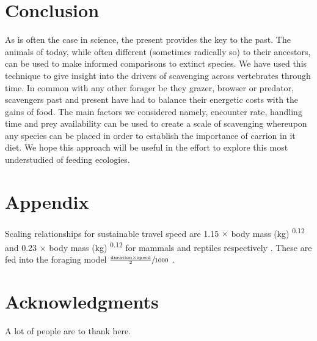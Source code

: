 \documentclass[a4paper,12pt]{article}
\begin{document}
\section*{Conclusion} 
As is often the case in science, the present provides the key to the past.
The animals of today, while often different (sometimes radically so) to their ancestors, can be used to make informed comparisons to extinct species. 
We have used this technique to give insight into the drivers of scavenging across vertebrates through time.
In common with any other forager be they grazer, browser or predator, scavengers past and present have had to balance their energetic costs with the gains of food. 
The main factors we considered namely, encounter rate, handling time and prey availability can be used to create a scale of scavenging whereupon any species can be placed in order to establish the importance of carrion in it diet.
We hope this approach will be useful in the effort to explore this most understudied of feeding ecologies. 


\section*{Appendix}
Scaling relationships for sustainable travel speed are 1.15 $\times$ body mass (kg) \textsuperscript{0.12} and 0.23 $\times$ body mass (kg) \textsuperscript{0.12} for mammals and reptiles respectively \citep{ruxton2004obligate}.
These are fed into the foraging model $\sfrac{\frac{\text{duration} \times \text{speed}}{2}}{1000}$ \citep{Enstipp2006Energetics}.

\section*{Acknowledgments}

A lot of people are to thank here.


\newpage



\end{document}
